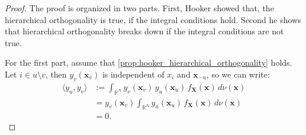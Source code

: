 \begin{proof}
    The proof is organized in two parts. First, Hooker showed that, the hierarchical orthogonality is true, if the integral conditions hold. Second he shows that hierarchical orthogonality breaks down if the integral conditions are not true.\par
    For the first part, assume that \autoref{prop:hooker_hierarchical_orthogonality} holds. Let $i \in u \setminus v$, then $y_v(\boldsymbol{x}_v)$ is independent of $x_i$ and $\boldsymbol{x}_{-u}$, so we can write:
\begin{equation}
\begin{aligned}
\langle y_u, y_v \rangle 
&:= \int_{\mathbb{R}^N} 
        y_v(\boldsymbol{x}_v)\, y_u(\boldsymbol{x}_u)\, 
        f_{\boldsymbol{X}}(\boldsymbol{x})\, 
        d \nu(\boldsymbol{x}) \\[0.3em]
&= y_v(\boldsymbol{x}_v) 
   \int_{\mathbb{R}^N} 
        y_u(\boldsymbol{x}_u)\, 
        f_{\boldsymbol{X}}(\boldsymbol{x})\, 
        d \nu(\boldsymbol{x}) \\[0.3em]
&= 0.
\end{aligned}
\end{equation}


\end{proof}
